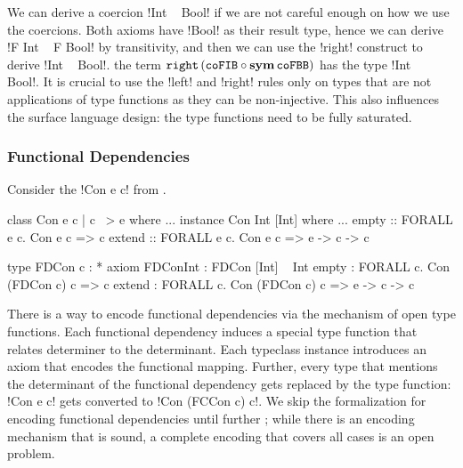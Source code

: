\documentclass[screen,nonacm,manuscript,review]{acmart} %
\begin{document}
We can derive a coercion !Int ~ Bool! if we are not careful enough on how we use the coercions. Both axioms have !Bool! as their result type, hence we can derive !F Int ~ F Bool! by transitivity, and then we can use the !right! construct to derive !Int ~ Bool!. the term $\texttt{right}\,({\texttt{coFIB}} \circ {\textbf{sym}\,{\texttt{coFBB}}})$ has the type !Int ~ Bool!. It is crucial to use the !left! and !right! rules only on types that are not applications of type functions as they can be non-injective. This also influences the surface language design: the type functions need to be fully saturated.

\subsubsection{Functional Dependencies}\label{sec:fc-encodes-fundeps}
Consider the !Con e c! from .

\begin{minipage}[ht]{0.5\linewidth}
\begin{code}
class Con e c | c ~> e where ...
instance Con Int [Int] where ...
  empty :: FORALL e c. Con e c => c
  extend :: FORALL e c. Con e c => e -> c -> c
\end{code}
\end{minipage}%
\begin{minipage}[ht]{0.5\linewidth}
\begin{code}
type FDCon c : *
axiom FDConInt : FDCon [Int] ~ Int
  empty  : FORALL c. Con (FDCon c) c => c
  extend : FORALL c. Con (FDCon c) c => e -> c -> c
\end{code}
\end{minipage}

There is a way to encode functional dependencies via the mechanism of open type functions. Each functional dependency induces a special type function that relates determiner to the determinant. Each typeclass instance introduces an axiom that encodes the functional mapping. Further, every type that mentions the determinant of the functional dependency gets replaced by the type function: !Con e c! gets converted to !Con (FCCon c) c!.
We skip the formalization for encoding functional dependencies until further ; while there is an encoding mechanism that is sound, a complete encoding that covers all cases is an open problem.
\end{document}
